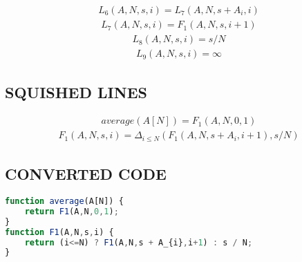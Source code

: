 \documentclass{article}
\begin{document}
\begin{equation*}\begin{split}
L_{6}\left(A,N,s,i\right) = L_{7}\left(A,N,s + A_{i},i\right)
\end{split}\end{equation*}
\begin{equation*}\begin{split}
L_{7}\left(A,N,s,i\right) = F_{1}\left(A,N,s,i+1\right)
\end{split}\end{equation*}
\begin{equation*}\begin{split}
L_{8}\left(A,N,s,i\right) = s / N
\end{split}\end{equation*}
\begin{equation*}\begin{split}
L_{9}\left(A,N,s,i\right) = \infty
\end{split}\end{equation*}


\subsection{SQUISHED LINES}
\begin{equation*}\begin{split}
average\left(A[N]\right) = F_{1}\left(A,N,0,1\right)
\end{split}\end{equation*}
\begin{equation*}\begin{split}
F_{1}\left(A,N,s,i\right) = \Delta_{i\leq N}\left(F_{1}\left(A,N,s + A_{i},i+1\right),s / N\right)
\end{split}\end{equation*}


\subsection{CONVERTED CODE}
\begin{lstlisting}[language=JavaScript]
function average(A[N]) {
    return F1(A,N,0,1);
}
function F1(A,N,s,i) {
    return (i<=N) ? F1(A,N,s + A_{i},i+1) : s / N;
}

\end{lstlisting}
\end{document}
